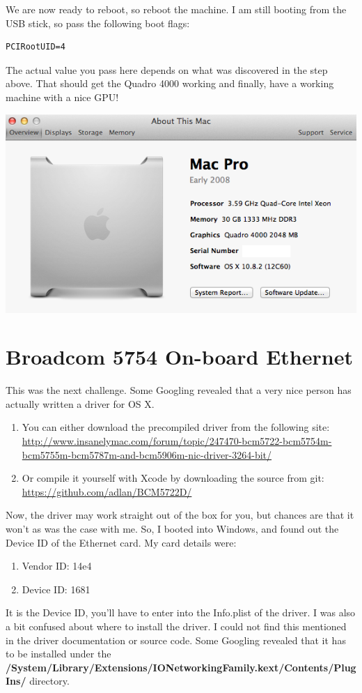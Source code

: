 \documentclass[11pt]{article}
\begin{document}
We are now ready to reboot, so reboot the machine.   I am still booting from the USB stick, so pass the following boot flags:
\begin{verbatim}
PCIRootUID=4
\end{verbatim}
The actual value you pass here depends on what was discovered in the step above.
That should get the Quadro 4000 working and finally, have a working machine with a nice GPU!

\vspace{1cm}

\includegraphics[scale=0.65]{screen-2.png}

\section{Broadcom 5754 On-board Ethernet}
This was the next challenge.  Some Googling revealed that a very nice person has actually written a driver for OS X.  
\begin{enumerate}
\item You can either download the precompiled driver from the following site:
\url{http://www.insanelymac.com/forum/topic/247470-bcm5722-bcm5754m-bcm5755m-bcm5787m-and-bcm5906m-nic-driver-3264-bit/}

\item Or compile it yourself with Xcode by downloading the source from git:
\url{https://github.com/adlan/BCM5722D/}
\end{enumerate}
Now, the driver may work straight out of the box for you, but chances are that it won't as was the case with me.  So, I booted into Windows, and found out the Device ID of the Ethernet card.  My card details were:
\begin{enumerate}
\item Vendor ID: 14e4
\item Device ID: 1681
\end{enumerate}
It is the Device ID, you'll have to enter into the Info.plist of the driver.  I was also a bit confused about where to install the driver.  I could not find this mentioned in the driver documentation or source code.   Some Googling revealed that it has to be installed under the
{\bf /System/Library/Extensions/IONetworkingFamily.kext/Contents/PlugIns/} directory.
\end{document}
